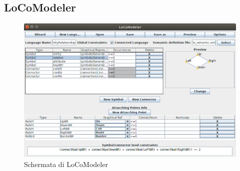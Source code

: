         \subsection{LoCoModeler}
        
            \begin{figure}[htbp]
                \centering
                \includegraphics[scale=1.5]{Figure/locomodeler.png}
                \caption{Schermata di LoCoModeler}
                \label{fig:locomodeler}
            \end{figure}

